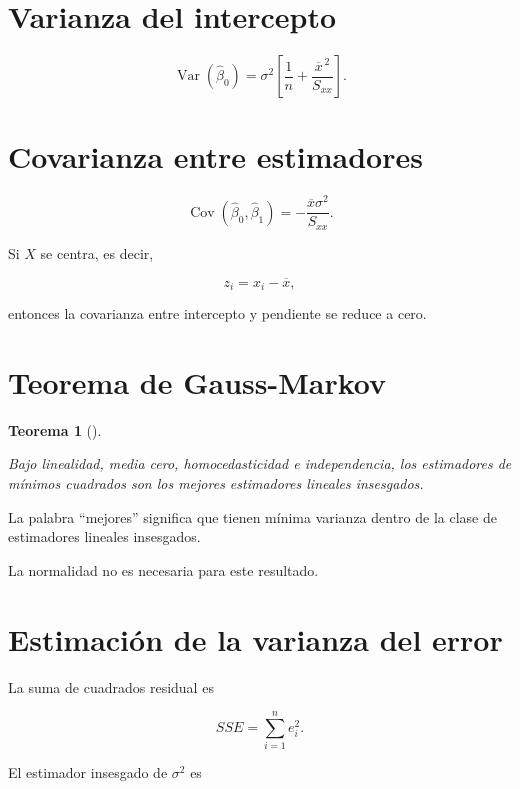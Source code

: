 \documentclass[
  spanish,
  11pt,
  letterpaper,
  DIV=11,
  numbers=noendperiod]{scrreprt}
\theoremstyle{definition}
\theoremstyle{plain}
\newtheorem{theorem}{Teorema}[chapter]
\theoremstyle{definition}
\theoremstyle{remark}
\begin{document}
\section{Varianza del intercepto}\label{varianza-del-intercepto}

\[
\operatorname{Var}
(
\widehat{\beta}_0
)
=
\sigma^2
\left[
\frac{1}{n}
+
\frac{
\overline{x}^{\,2}
}{
S_{xx}
}
\right].
\]

\section{Covarianza entre
estimadores}\label{covarianza-entre-estimadores}

\[
\operatorname{Cov}
(
\widehat{\beta}_0,
\widehat{\beta}_1
)
=
-
\frac{
\overline{x}\sigma^2
}{
S_{xx}
}.
\]

Si \(X\) se centra, es decir,

\[
z_i=x_i-\overline{x},
\]

entonces la covarianza entre intercepto y pendiente se reduce a cero.

\section{Teorema de Gauss-Markov}\label{teorema-de-gauss-markov}

\begin{theorem}[]\protect\hypertarget{thm-gauss-markov-simple}{}\label{thm-gauss-markov-simple}

Bajo linealidad, media cero, homocedasticidad e independencia, los
estimadores de mínimos cuadrados son los mejores estimadores lineales
insesgados.

\end{theorem}

La palabra ``mejores'' significa que tienen mínima varianza dentro de la
clase de estimadores lineales insesgados.

La normalidad no es necesaria para este resultado.

\section{Estimación de la varianza del
error}\label{estimaciuxf3n-de-la-varianza-del-error}

La suma de cuadrados residual es

\[
SSE
=
\sum_{i=1}^{n}
e_i^2.
\]

El estimador insesgado de \(\sigma^2\) es
\end{document}

